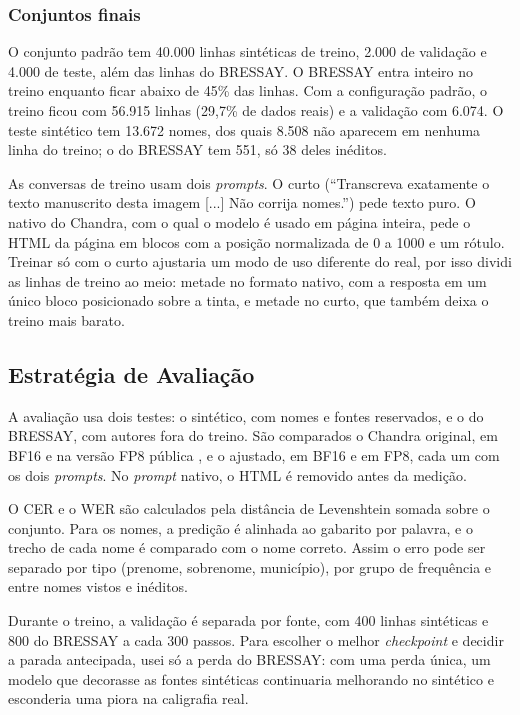 \documentclass[12pt,a4paper]{article}
\begin{document}
\subsubsection{Conjuntos finais}
O conjunto padrão tem 40.000 linhas sintéticas de treino, 2.000 de validação e 4.000 de teste, além das linhas do BRESSAY. O BRESSAY entra inteiro no treino enquanto ficar abaixo de 45\% das linhas. Com a configuração padrão, o treino ficou com 56.915 linhas (29,7\% de dados reais) e a validação com 6.074. O teste sintético tem 13.672 nomes, dos quais 8.508 não aparecem em nenhuma linha do treino; o do BRESSAY tem 551, só 38 deles inéditos.

As conversas de treino usam dois \emph{prompts}. O curto (``Transcreva exatamente o texto manuscrito desta imagem [...] Não corrija nomes.'') pede texto puro. O nativo do Chandra, com o qual o modelo é usado em página inteira, pede o HTML da página em blocos com a posição normalizada de 0 a 1000 e um rótulo. Treinar só com o curto ajustaria um modo de uso diferente do real, por isso dividi as linhas de treino ao meio: metade no formato nativo, com a resposta em um único bloco posicionado sobre a tinta, e metade no curto, que também deixa o treino mais barato.

\subsection{Estratégia de Avaliação}
\label{subsec:aval}

A avaliação usa dois testes: o sintético, com nomes e fontes reservados, e o do BRESSAY, com autores fora do treino. São comparados o Chandra original, em BF16 e na versão FP8 pública \cite{chandrafp8}, e o ajustado, em BF16 e em FP8, cada um com os dois \emph{prompts}. No \emph{prompt} nativo, o HTML é removido antes da medição.

O CER e o WER são calculados pela distância de Levenshtein somada sobre o conjunto. Para os nomes, a predição é alinhada ao gabarito por palavra, e o trecho de cada nome é comparado com o nome correto. Assim o erro pode ser separado por tipo (prenome, sobrenome, município), por grupo de frequência e entre nomes vistos e inéditos.

Durante o treino, a validação é separada por fonte, com 400 linhas sintéticas e 800 do BRESSAY a cada 300 passos. Para escolher o melhor \emph{checkpoint} e decidir a parada antecipada, usei só a perda do BRESSAY: com uma perda única, um modelo que decorasse as fontes sintéticas continuaria melhorando no sintético e esconderia uma piora na caligrafia real.
\end{document}
